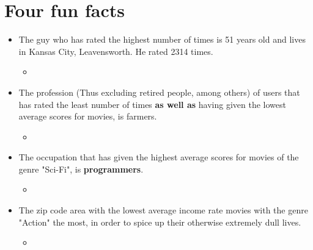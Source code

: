 \section{Four fun facts}
\begin{itemize}
	\item The guy who has rated the highest number of times is 51 years old and lives in Kansas City, Leavensworth. He rated 2314 times. \begin{itemize}
		\item \begin{lstlisting} \end{lstlisting}
	\end{itemize}
	\item The profession (Thus excluding retired people, among others) of users that has rated the least number of times \textbf{as well as} having given the lowest average scores for movies, is farmers. \begin{itemize}
		\item \begin{lstlisting} \end{lstlisting}
	\end{itemize}
	\item The occupation that has given the highest average scores for movies of the genre "Sci-Fi", is \textbf{programmers}. \begin{itemize}
		\item \begin{lstlisting} \end{lstlisting}
	\end{itemize}
	\item The zip code area with the lowest average income rate movies with the genre "Action" the most, in order to spice up their otherwise extremely dull lives. \begin{itemize}
		\item \begin{lstlisting} \end{lstlisting}
	\end{itemize}
\end{itemize}
